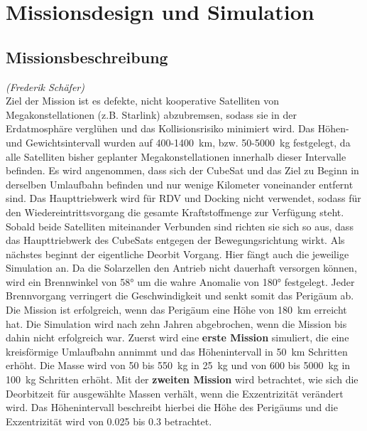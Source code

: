 \chapter{Missionsdesign und Simulation}


\section{Missionsbeschreibung}
\hfill\emph{(Frederik Schäfer)}\\	
	Ziel der Mission ist es defekte, nicht kooperative Satelliten von Megakonstellationen (z.B. Starlink) abzubremsen, sodass sie in der Erdatmosphäre verglühen und das Kollisionsrisiko minimiert wird. Das Höhen- und Gewichtsintervall wurden auf \num{400}-\SI{1400}{\kilo\metre}, bzw. \num{50}-\SI{5000}{\kilogram} festgelegt, da alle Satelliten bisher geplanter Megakonstellationen innerhalb dieser Intervalle befinden.
Es wird angenommen, dass sich der CubeSat und das Ziel zu Beginn in derselben Umlaufbahn befinden und nur wenige Kilometer voneinander entfernt sind. Das Haupttriebwerk wird für RDV und Docking nicht verwendet, sodass für den Wiedereintrittsvorgang die gesamte Kraftstoffmenge zur Verfügung steht. Sobald beide Satelliten miteinander Verbunden sind richten sie sich so aus, dass das Haupttriebwerk des CubeSats entgegen der Bewegungsrichtung wirkt. Als nächstes beginnt der eigentliche Deorbit Vorgang. Hier fängt auch die jeweilige Simulation an. Da die Solarzellen den Antrieb nicht dauerhaft versorgen können, wird ein Brennwinkel von \num{58}° um die wahre Anomalie von \num{180}° festgelegt.
Jeder Brennvorgang verringert die Geschwindigkeit und senkt somit das Perigäum ab. Die Mission ist erfolgreich, wenn das Perigäum eine Höhe von \SI{180}{\kilo\metre} erreicht hat. Die Simulation wird nach zehn Jahren abgebrochen, wenn die Mission bis dahin nicht erfolgreich war. 
Zuerst wird eine \textbf{erste Mission} simuliert, die eine kreisförmige Umlaufbahn annimmt und das Höhenintervall in \SI{50}{\kilo\metre} Schritten erhöht. Die Masse wird von \num{50} bis \SI{550}{\kilogram} in \SI{25}{\kilogram} und von \num{600} bis \SI{5000}{\kilogram} in \SI{100}{\kilogram} Schritten erhöht.
Mit der \textbf{zweiten Mission} wird betrachtet, wie sich die Deorbitzeit für ausgewählte Massen verhält, wenn die Exzentrizität verändert wird. Das Höhenintervall beschreibt hierbei die Höhe des Perigäums und die Exzentrizität wird von \num{0.025} bis \num{0.3} betrachtet.
	
